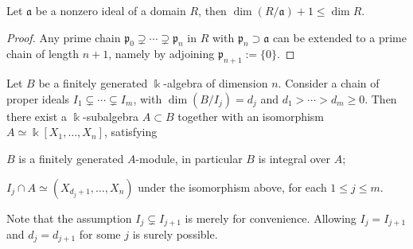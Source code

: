 \begin{lemma}\label{prop:normalization-aux}
	Let $\mathfrak{a}$ be a nonzero ideal of a domain $R$, then $\dim(R/\mathfrak{a}) + 1 \leq \dim R$.
\end{lemma}
\begin{proof}
	Any prime chain $\mathfrak{p}_0 \supsetneq \cdots \supsetneq \mathfrak{p}_n$ in $R$ with $\mathfrak{p}_n \supset \mathfrak{a}$ can be extended to a prime chain of length $n+1$, namely by adjoining $\mathfrak{p}_{n+1} := \{0\}$.
\end{proof}

\begin{theorem}\label{prop:Noether-normalization}
	Let $B$ be a finitely generated $\Bbbk$-algebra of dimension $n$. Consider a chain of proper ideals $I_1 \subsetneq \cdots \subsetneq I_m$, with $\dim(B/I_j) = d_j$ and $d_1 > \cdots > d_m \geq 0$. Then there exist a $\Bbbk$-subalgebra $A \subset B$ together with an isomorphism $A \simeq \Bbbk[X_1, \ldots, X_n]$, satisfying
	\begin{compactitem}
		\item $B$ is a finitely generated $A$-module, in particular $B$ is integral over $A$;
		\item $I_j \cap A \simeq (X_{d_j+1}, \ldots, X_n)$ under the isomorphism above, for each $1 \leq j \leq m$.
	\end{compactitem}
\end{theorem}

Note that the assumption $I_j \subsetneq I_{j+1}$ is merely for convenience. Allowing $I_j = I_{j+1}$ and $d_j = d_{j+1}$ for some $j$ is surely possible.

